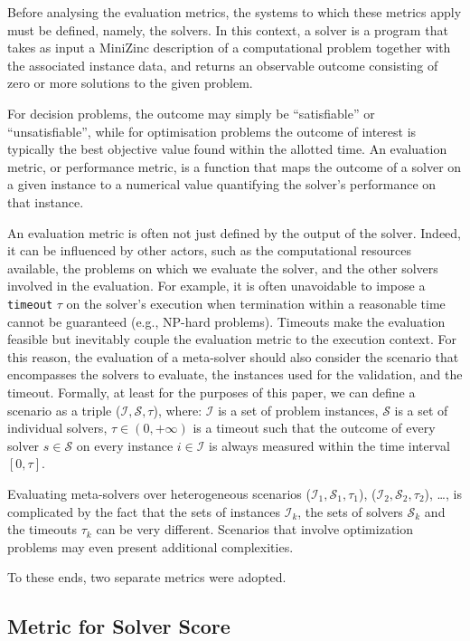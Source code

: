 \documentclass[../../main]{subfiles}
\begin{document}
Before analysing the evaluation metrics, the systems to which these metrics apply must be defined, namely, the solvers. In this context, a solver is a program that takes as input a MiniZinc description of a computational problem together with the associated instance data, and returns an observable outcome consisting of zero or more solutions to the given problem.  

For decision problems, the outcome may simply be ``satisfiable'' or ``unsatisfiable'', while for optimisation problems the outcome of interest is typically the best objective value found within the allotted time. An evaluation metric, or performance metric, is a function that maps the outcome of a solver on a given instance to a numerical value quantifying the solver's performance on that instance. 

An evaluation metric is often not just defined by the output of the solver. Indeed, it can be influenced by other actors, such as the computational resources available, the problems on which we evaluate the solver, and the other solvers involved in the evaluation. For example, it is often unavoidable to impose a \texttt{timeout} \(\tau\) on the solver's execution when termination within a reasonable time cannot be guaranteed (e.g., NP-hard problems). Timeouts make the evaluation feasible but inevitably couple the evaluation metric to the execution context. For this reason, the evaluation of a meta-solver should also consider the scenario that encompasses the solvers to evaluate, the instances used for the validation, and the timeout. Formally, at least for the purposes of this paper, we can define a scenario as a triple (\(\mathcal{I}, \mathcal{S},\tau\)), where: \(\mathcal{I}\) is a set of problem instances, \(\mathcal{S}\) is a set of individual solvers, \(\tau \in (0,+\infty) \) is a timeout such that the outcome of every solver \(s \in \mathcal{S}\) on every instance \(i \in \mathcal{I}\) is always measured within the time interval \([0,\tau]\).

Evaluating meta-solvers over heterogeneous scenarios (\(\mathcal{I}_1, \mathcal{S}_1,\tau_1\)), (\(\mathcal{I}_2, \mathcal{S}_2,\tau_2\)), \dots, is complicated by the fact that the sets of instances \(\mathcal{I}_k\), the sets of solvers \(\mathcal{S}_k\) and the timeouts \(\tau_k\) can be very different. Scenarios that involve optimization problems may even present additional complexities.

To these ends, two separate metrics were adopted.

\subsection{Metric for Solver Score}
\label{sec:scoreMetric}
\end{document}
